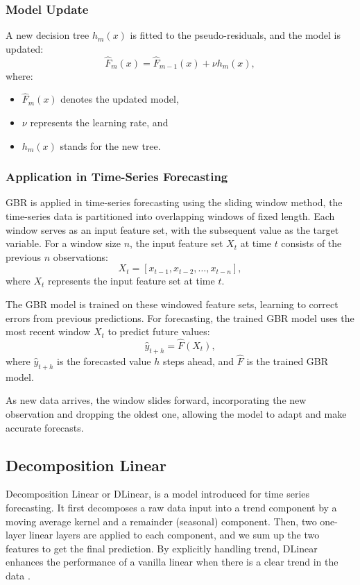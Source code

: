 \documentclass{ieeeojies}
\begin{document}
\subsubsection{Model Update}

A new decision tree \(h_m(x)\) is fitted to the pseudo-residuals, and the model is updated:
\begin{equation}
    \hat{F}_m(x) = \hat{F}_{m-1}(x) + \nu h_m(x),
\end{equation}
where:
\begin{itemize}
    \item \(\hat{F}_m(x)\) denotes the updated model,
    \item \(\nu\) represents the learning rate, and
    \item \(h_m(x)\) stands for the new tree.
\end{itemize}

\subsubsection{Application in Time-Series Forecasting}

GBR is applied in time-series forecasting using the sliding window method, the time-series data is partitioned into overlapping windows of fixed length. Each window serves as an input feature set, with the subsequent value as the target variable. For a window size \(n\), the input feature set \(X_t\) at time \(t\) consists of the previous \(n\) observations:
\begin{equation}
    X_t = [x_{t-1}, x_{t-2}, \ldots, x_{t-n}],
\end{equation}
where \(X_t\) represents the input feature set at time \(t\).

The GBR model is trained on these windowed feature sets, learning to correct errors from previous predictions. For forecasting, the trained GBR model uses the most recent window \(X_t\) to predict future values:
\begin{equation}
    \hat{y}_{t+h} = \hat{F}(X_t),
\end{equation}
where \(\hat{y}_{t+h}\) is the forecasted value \(h\) steps ahead, and \(\hat{F}\) is the trained GBR model.

As new data arrives, the window slides forward, incorporating the new observation and dropping the oldest one, allowing the model to adapt and make accurate forecasts.


\subsection{Decomposition Linear}
Decomposition Linear or DLinear, is a model introduced for time series forecasting.  It first decomposes a raw data input into a trend component by a moving average kernel and a remainder (seasonal) component. Then, two
one-layer linear layers are applied to each component,
and we sum up the two features to get the final prediction. By explicitly handling trend, DLinear enhances
the performance of a vanilla linear when there is a clear
trend in the data \cite{b15}.
\end{document}

